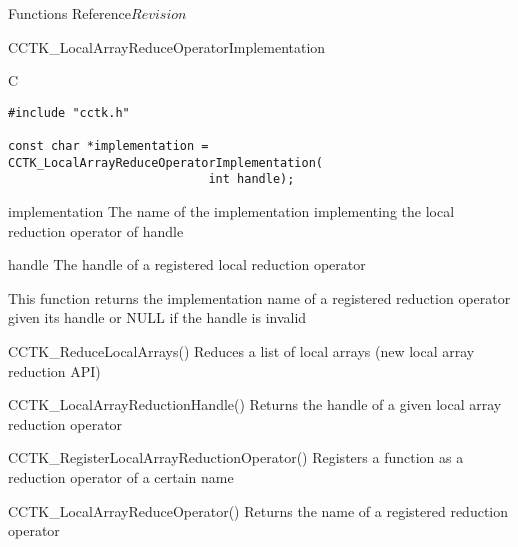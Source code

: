 \begin{cactuspart}{ Functions Reference}{}{$Revision$}
\begin{FunctionDescription}{CCTK\_LocalArrayReduceOperatorImplementation}
\begin{SynopsisSection}
\begin{Synopsis}{C}
\begin{verbatim}
#include "cctk.h"

const char *implementation = CCTK_LocalArrayReduceOperatorImplementation(
                            int handle);
\end{verbatim}
\end{Synopsis}
\end{SynopsisSection}

\begin{ResultSection}
\begin{Result}{implementation}
The name of the implementation implementing the local reduction operator of handle \newline {}
\end{Result}
\end{ResultSection}

\begin{ParameterSection}
\begin{Parameter}{handle}
The handle of a registered local reduction operator
\end{Parameter}
\end{ParameterSection}

\begin{Discussion}
This function returns the implementation name of a registered reduction operator given
its handle or NULL if the handle is invalid
\end{Discussion}

\begin{SeeAlsoSection}
\begin{SeeAlso}{CCTK\_ReduceLocalArrays()}
Reduces a list of local arrays (new local array reduction API)
\end{SeeAlso}

\begin{SeeAlso}{CCTK\_LocalArrayReductionHandle()}
Returns the handle of a given local array reduction operator
\end{SeeAlso}

\begin{SeeAlso}{CCTK\_RegisterLocalArrayReductionOperator()}
Registers a function as a reduction operator of a certain name
\end{SeeAlso}
\begin{SeeAlso}{CCTK\_LocalArrayReduceOperator()}
Returns the name of a registered reduction operator
\end{SeeAlso}


\end{SeeAlsoSection}
\end{FunctionDescription}
\end{cactuspart}
